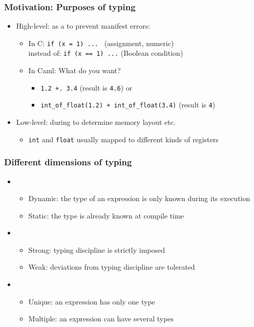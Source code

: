 \documentclass{beamer}
\begin{document}
\begin{frame}[fragile]\frametitle{Motivation: Purposes of typing}

  \begin{itemize}
  \item High-level: as a  to prevent manifest errors:
    \begin{itemize}
    \item In C:  \texttt{if (x = 1) ... } (assignment, numeric)\\
      instead of: \texttt{if (x == 1) ...} (Boolean condition)
    \item In Caml: What do you want?
      \begin{itemize}
      \item \texttt{1.2 +. 3.4} (result is \texttt{4.6}) or
      \item \texttt{int\_of\_float(1.2) + int\_of\_float(3.4)} (result is \texttt{4})
      \end{itemize}
    \end{itemize}

  \item Low-level: during  to determine memory layout etc.
    \begin{itemize}
    \item \texttt{int} and \texttt{float} usually mapped to different kinds of registers
    \end{itemize}
  \end{itemize}
  
\end{frame}

\begin{frame}[fragile]\frametitle{Different dimensions of typing}

  \begin{itemize}
  \item {}
    \begin{itemize}
    \item Dynamic: the type of an expression is only known during its
      execution
    \item Static: the type is already known at compile time
    \end{itemize}
  \item {}
    \begin{itemize}
    \item Strong: typing discipline is strictly imposed
    \item Weak: deviations from typing discipline are tolerated
    \end{itemize}
  \item {}
    \begin{itemize}
    \item Unique: an expression has only one type
    \item Multiple: an expression can have several types
    \end{itemize}
  \end{itemize}

\end{frame}
\end{document}
